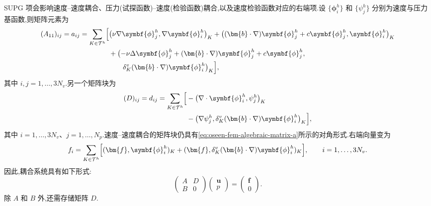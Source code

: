 \begin{note}[实现]\label{note:oseen-spg-implementation}
SUPG 项会影响速度--速度耦合、压力(试探函数)--速度(检验函数)耦合,以及速度检验函数对应的右端项.设 $\{\symbf{\phi}_i^h\}$ 和 $\{\psi_j^h\}$ 分别为速度与压力基函数,则矩阵元素为
\[
\begin{aligned}
 (A_{11})_{ij}=a_{ij}
 =\sum_{K\in\mathcal{T}^h}\Bigl[&
   \bigl(\nu\nabla\symbf{\phi}_j^h,
               \nabla\symbf{\phi}_i^h\bigr)_K
  +\bigl((\bm{b}\cdot\nabla)\symbf{\phi}_j^h
               +c\symbf{\phi}_j^h,\symbf{\phi}_i^h\bigr)_K\\
 &+\bigl(-\nu\Delta\symbf{\phi}_j^h
        +(\bm{b}\cdot\nabla)\symbf{\phi}_j^h
        +c\symbf{\phi}_j^h,\\
 &\qquad\delta_K^v(\bm{b}\cdot\nabla)
        \symbf{\phi}_i^h\bigr)_K
 \Bigr],
\end{aligned}
\]
其中 $i,j=1,\ldots,3N_v$.另一个矩阵块为
\[
\begin{aligned}
 (D)_{ij}=d_{ij}
 =\sum_{K\in\mathcal{T}^h}\Bigl[&
   -\bigl(\nabla\cdot\symbf{\phi}_i^h,\psi_j^h\bigr)_K\\
 &-\bigl(\nabla\psi_j^h,
       \delta_K^v(\bm{b}\cdot\nabla)\symbf{\phi}_i^h\bigr)_K
 \Bigr],
\end{aligned}
\]
其中 $i=1,\ldots,3N_v$、$j=1,\ldots,N_p$.速度--速度耦合的矩阵块仍具有\cref{eq:oseen-fem-algebraic-matrix-a}所示的对角形式.右端向量变为
\[
 f_i=\sum_{K\in\mathcal{T}^h}
   \Bigl[(\bm{f},\symbf{\phi}_i^h)_K
       +(\bm{f},\delta_K^v(\bm{b}\cdot\nabla)
                            \symbf{\phi}_i^h)_K\Bigr],
 \qquad i=1,\ldots,3N_v.
\]
因此,耦合系统具有如下形式:
\[
 \begin{pmatrix}A&D\\B&0\end{pmatrix}
 \begin{pmatrix}\bm{u}\\p\end{pmatrix}
 =\begin{pmatrix}\bm{f}\\0\end{pmatrix}.
\]
除 $A$ 和 $B$ 外,还需存储矩阵 $D$.


\end{note}
